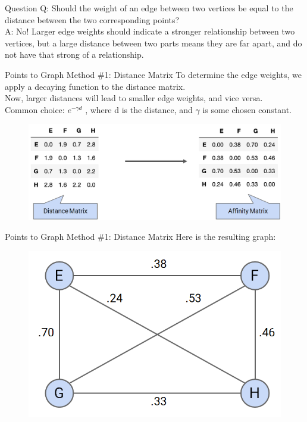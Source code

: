\documentclass[aspectratio=169]{../latex_main/tntbeamer}  %
\begin{document}
	
	
	\begin{frame}{Question}
	    Q: Should the weight of an edge between two vertices be equal to the distance between the two corresponding points?\\
	    \bigskip
	    A: No! Larger edge weights should indicate a stronger relationship between two vertices, but a large distance between two parts means they are far apart, and do not have that strong of a relationship.

	\end{frame}
	
	
	\begin{frame}{Points to Graph Method \#1: Distance Matrix}
	    To determine the edge weights, we apply a decaying function to the distance matrix.\\
        Now, larger distances will lead to smaller edge weights, and vice versa.\\
        Common choice:       $e^{-\gamma d}$        , where d is the distance, and $\gamma$ is some chosen constant.

        \begin{figure}
            \centering
            \includegraphics[scale=.43]{Bild19}
        \end{figure}    
	\end{frame}
	
	
	
	\begin{frame}{Points to Graph Method \#1: Distance Matrix}
	    Here is the resulting graph:
	    \begin{figure}
	        \centering
	        \includegraphics[scale=.5]{Bild20}
	    \end{figure}
	\end{frame}
	
\end{document}
